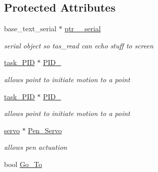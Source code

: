 \subsection*{Protected Attributes}
\begin{DoxyCompactItemize}
\item 
\hypertarget{classpoint_a0faaab9d77ce6901394cc600031dbd68}{base\-\_\-text\-\_\-serial $\ast$ \hyperlink{classpoint_a0faaab9d77ce6901394cc600031dbd68}{ptr\-\_\-\_\-serial}}\label{classpoint_a0faaab9d77ce6901394cc600031dbd68}

\begin{DoxyCompactList}\small\item\em serial object so tas\-\_\-read can echo stuff to screen \end{DoxyCompactList}\item 
\hypertarget{classpoint_a182d5d53e4670536ad7c33429d26d2fd}{\hyperlink{classtask___p_i_d}{task\-\_\-\-P\-I\-D} $\ast$ \hyperlink{classpoint_a182d5d53e4670536ad7c33429d26d2fd}{P\-I\-D\-\_}}\label{classpoint_a182d5d53e4670536ad7c33429d26d2fd}

\begin{DoxyCompactList}\small\item\em allows point to initiate motion to a point \end{DoxyCompactList}\item 
\hypertarget{classpoint_a044c64d033c5037d047e9e9284dbc0f6}{\hyperlink{classtask___p_i_d}{task\-\_\-\-P\-I\-D} $\ast$ \hyperlink{classpoint_a044c64d033c5037d047e9e9284dbc0f6}{P\-I\-D\-\_}}\label{classpoint_a044c64d033c5037d047e9e9284dbc0f6}

\begin{DoxyCompactList}\small\item\em allows point to initiate motion to a point \end{DoxyCompactList}\item 
\hypertarget{classpoint_a145a99706897943b3fd67e82bedfc67d}{\hyperlink{classservo}{servo} $\ast$ \hyperlink{classpoint_a145a99706897943b3fd67e82bedfc67d}{Pen\-\_\-\-Servo}}\label{classpoint_a145a99706897943b3fd67e82bedfc67d}

\begin{DoxyCompactList}\small\item\em allows pen actuation \end{DoxyCompactList}\item 
\hypertarget{classpoint_af084bab290868a439d2e50d8bec319f8}{bool \hyperlink{classpoint_af084bab290868a439d2e50d8bec319f8}{Go\-\_\-\-To}}\label{classpoint_af084bab290868a439d2e50d8bec319f8}


\end{DoxyCompactItemize}
